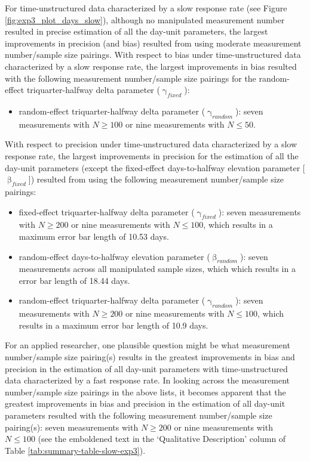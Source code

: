 \documentclass[
12pt, %
twoside,
english]{guelphthesis}
\begin{document}
For time-unstructured data characterized by a slow response rate (see Figure \ref{fig:exp3_plot_days_slow}), although no manipulated measurement number resulted in precise estimation of all the day-unit parameters, the largest improvements in precision (and bias) resulted from using moderate measurement number/sample size pairings. With respect to bias under time-unstructured data characterized by a slow response rate, the largest improvements in bias resulted with the following measurement number/sample size pairings for the random-effect triquarter-halfway delta parameter (\(\upgamma_{fixed}\)):
\begin{itemize}
\tightlist
\item
  random-effect triquarter-halfway delta parameter (\(\upgamma_{random}\)): seven measurements with \(N \ge 100\) or nine measurements with \(N \le 50\).
\end{itemize}
\noindent With respect to precision under time-unstructured data characterized by a slow response rate, the largest improvements in precision for the estimation of all the day-unit parameters (except the fixed-effect days-to-halfway elevation parameter {[}\(\upbeta_{fixed}\){]}) resulted from using the following measurement number/sample size pairings:
\begin{itemize}
\tightlist
\item
  fixed-effect triquarter-halfway delta parameter (\(\upgamma_{fixed}\)): seven measurements with \(N \ge 200\) or nine measurements with \(N \le 100\), which results in a maximum error bar length of 10.53 days.
\item
  random-effect days-to-halfway elevation parameter (\(\upbeta_{random}\)): seven measurements across all manipulated sample sizes, which which results in a error bar length of 18.44 days.
\item
  random-effect triquarter-halfway delta parameter (\(\upgamma_{random}\)): seven measurements with \(N \ge 200\) or nine measurements with \(N \le 100\), which results in a maximum error bar length of 10.9 days.
\end{itemize}
For an applied researcher, one plausible question might be what measurement number/sample size pairing(s) results in the greatest improvements in bias and precision in the estimation of all day-unit parameters with time-unstructured data characterized by a fast response rate. In looking across the measurement number/sample size pairings in the above lists, it becomes apparent that the greatest improvements in bias and precision in the estimation of all day-unit parameters resulted with the following measurement number/sample size pairing(s): seven measurements with \(N \ge 200\) or nine measurements with \(N \le 100\) (see the emboldened text in the `Qualitative Description' column of Table \ref{tab:summary-table-slow-exp3}).
\end{document}
